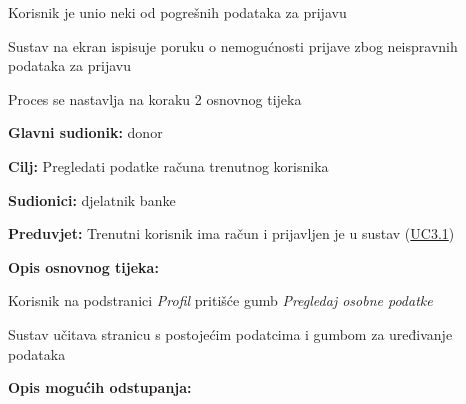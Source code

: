 \begin{packed_item}
\begin{packed_enum}
	                        \item[3.b] Korisnik je unio neki od pogrešnih podataka za prijavu
	                        \item[] \begin{packed_enum}
    	                        \item Sustav na ekran ispisuje poruku o nemogućnosti prijave zbog neispravnih podataka za prijavu
    	                        \item Proces se nastavlja na koraku 2 osnovnog tijeka
					    	\end{packed_enum}
						\end{packed_enum}
						
					\end{packed_item}
					
						
					\noindent {}
					\begin{packed_item}  \label{UC4}
	
						\item \textbf{Glavni sudionik: }donor
						\item  \textbf{Cilj:} Pregledati podatke računa trenutnog korisnika
						\item  \textbf{Sudionici:} djelatnik banke
						\item  \textbf{Preduvjet:} Trenutni korisnik ima račun i prijavljen je u sustav (\hyperref[UC3.1]{UC3.1})
						\item  \textbf{Opis osnovnog tijeka:}
						
						\item[] \begin{packed_enum}
	
	                        \item Korisnik na podstranici \textit{Profil} pritišće gumb \textit{Pregledaj osobne podatke}
	                        \item Sustav učitava stranicu s postojećim podatcima i gumbom za uređivanje podataka

						\end{packed_enum}
						
						\item  \textbf{Opis mogućih odstupanja:}

						
					\end{packed_item}
					
